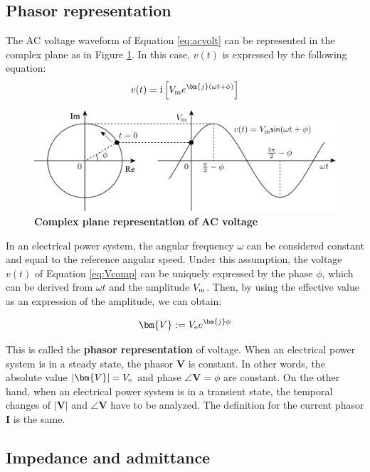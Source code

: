 \documentclass[graybox, envcountchap]{svmult}
\begin{document}
\subsection{Phasor representation}\label{sec:intphas}
The AC voltage waveform of Equation \ref{eq:acvolt} can be represented in the
complex plane as in Figure \ref{fig:phasorrep}. In this case, $v(t)$ is
expressed by the following equation:
\begin{equation}\label{eq:Vcomp}
  v(t)= \imag \left[ V_{\rm m} e^{\bm{j}(\omega t + \phi)} \right]
\end{equation}

\begin{figure}[t]
  \centering
  \includegraphics[width = .99\linewidth]{figs/phasorrep}
  \caption{\textbf{Complex plane representation of AC voltage}}
  \label{fig:phasorrep}
  \medskip
\end{figure}
In an electrical power system, the angular frequency $\omega$ can be considered
constant and equal to the reference angular speed. Under this assumption, the
voltage $v(t)$ of Equation \ref{eq:Vcomp} can be uniquely expressed by the phase
$\phi$, which can be derived from $\omega t$ and the amplitude $V_{\rm m}$.
Then, by using the effective value as an expression of the amplitude, we can
obtain:

\begin{equation}\label{eq:Vphasor}
  \bm{V}:= V_{\rm e} e^{\bm{j}\phi}
\end{equation}

This is called the \textbf{phasor representation} of voltage. When an electrical
power system is in a steady state, the phasor $\bm{V}$ is constant. In other
words, the absolute value $|\bm{V}|=V_{\rm e}$ and phase $\angle \bm{V}=\phi$
are constant. On the other hand, when an electrical power system is in a
transient state, the temporal changes of $|\bm{V}|$ and $\angle \bm{V}$ have to
be analyzed. The definition for the current phasor $\bm{I}$ is the same.

\subsection{Impedance and admittance}
\end{document}
